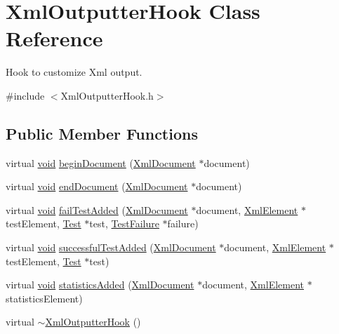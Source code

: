 \hypertarget{class_xml_outputter_hook}{\section{Xml\-Outputter\-Hook Class Reference}
\label{class_xml_outputter_hook}
}


Hook to customize Xml output.  




{\ttfamily \#include $<$Xml\-Outputter\-Hook.\-h$>$}

\subsection*{Public Member Functions}
\begin{DoxyCompactItemize}
\item 
virtual \hyperlink{wglew_8h_aeea6e3dfae3acf232096f57d2d57f084}{void} \hyperlink{class_xml_outputter_hook_a1d2b5d5d0fc42d273d6430522a70ccbb}{begin\-Document} (\hyperlink{class_xml_document}{Xml\-Document} $\ast$document)
\item 
virtual \hyperlink{wglew_8h_aeea6e3dfae3acf232096f57d2d57f084}{void} \hyperlink{class_xml_outputter_hook_a300e2a4ef46db4e76428e32f7c7e6a23}{end\-Document} (\hyperlink{class_xml_document}{Xml\-Document} $\ast$document)
\item 
virtual \hyperlink{wglew_8h_aeea6e3dfae3acf232096f57d2d57f084}{void} \hyperlink{class_xml_outputter_hook_a77310985e055cc2c67e91a42c524fbbe}{fail\-Test\-Added} (\hyperlink{class_xml_document}{Xml\-Document} $\ast$document, \hyperlink{class_xml_element}{Xml\-Element} $\ast$test\-Element, \hyperlink{class_test}{Test} $\ast$test, \hyperlink{class_test_failure}{Test\-Failure} $\ast$failure)
\item 
virtual \hyperlink{wglew_8h_aeea6e3dfae3acf232096f57d2d57f084}{void} \hyperlink{class_xml_outputter_hook_adbcf6ad2cb85d6f1015306fadb7eadcf}{successful\-Test\-Added} (\hyperlink{class_xml_document}{Xml\-Document} $\ast$document, \hyperlink{class_xml_element}{Xml\-Element} $\ast$test\-Element, \hyperlink{class_test}{Test} $\ast$test)
\item 
virtual \hyperlink{wglew_8h_aeea6e3dfae3acf232096f57d2d57f084}{void} \hyperlink{class_xml_outputter_hook_a0e602260274d4f005affb4ee84ce4c4a}{statistics\-Added} (\hyperlink{class_xml_document}{Xml\-Document} $\ast$document, \hyperlink{class_xml_element}{Xml\-Element} $\ast$statistics\-Element)
\item 
virtual \hyperlink{class_xml_outputter_hook_a9db898b399bf21f2d0716a1dfa0bef92}{$\sim$\-Xml\-Outputter\-Hook} ()
\end{DoxyCompactItemize}


